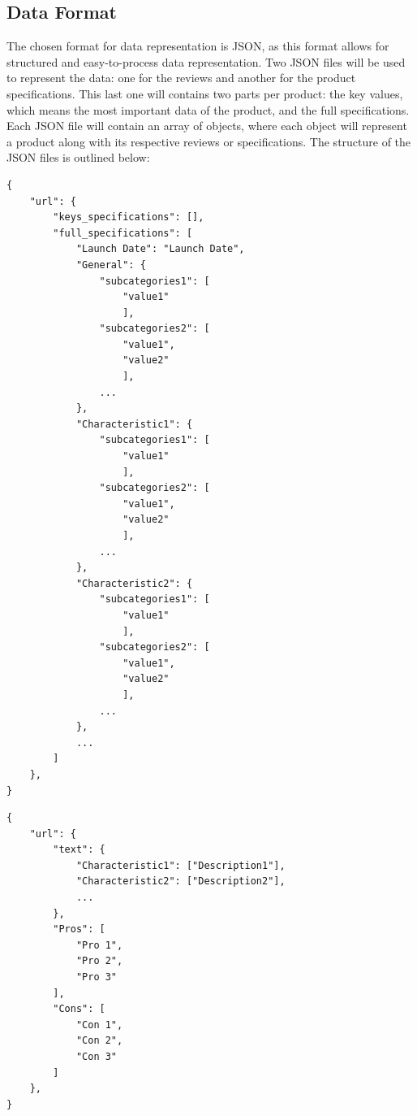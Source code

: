 \subsection{Data Format}
The chosen format for data representation is JSON, as this format allows for structured and easy-to-process data representation. Two JSON files will be used to represent the data: one for the reviews and another for the product specifications. This last one will contains two parts per product: the key values, which means the most important data of the product, and the full specifications. Each JSON file will contain an array of objects, where each object will represent a product along with its respective reviews or specifications. The structure of the JSON files is outlined below:
\newpage
\begin{lstlisting}[style=jsonstyle, frame = single, caption=JSON Data Format Product specification, label=code:json-data-format]
{
    "url": {
        "keys_specifications": [],
        "full_specifications": [
            "Launch Date": "Launch Date",
            "General": {
                "subcategories1": [
                    "value1"
                    ],
                "subcategories2": [
                    "value1",
                    "value2"
                    ],
                ...
            },
            "Characteristic1": {
                "subcategories1": [
                    "value1"
                    ],
                "subcategories2": [
                    "value1",
                    "value2"
                    ],
                ...
            },
            "Characteristic2": {
                "subcategories1": [
                    "value1"
                    ],
                "subcategories2": [
                    "value1",
                    "value2"
                    ],
                ...
            },
            ...
        ]
    },
}
\end{lstlisting}
\newpage
\begin{lstlisting}[style=jsonstyle, frame = single, caption=JSON Data Format reviews, label=code:json-data-format]
{
    "url": {
        "text": {
            "Characteristic1": ["Description1"],
            "Characteristic2": ["Description2"],
            ...
        },
        "Pros": [
            "Pro 1",
            "Pro 2",
            "Pro 3"
        ],
        "Cons": [
            "Con 1",
            "Con 2",
            "Con 3"
        ]
    },
}
\end{lstlisting}

